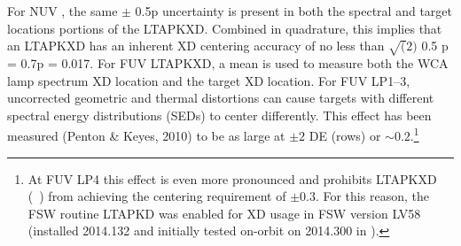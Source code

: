For NUV , the same $\pm$ 0.5p uncertainty is present in both the spectral and target locations portions of the \textsc{LTAPKXD}. Combined in quadrature, this implies that
an \textsc{LTAPKXD} has an inherent XD centering accuracy of no less than $\sqrt(2)$ 0.5 p = 0.7p = 0.017\arcsec. For FUV \textsc{LTAPKXD}, a mean is used to measure both the WCA lamp spectrum XD location and the target XD location.
For FUV LP1--3, uncorrected geometric and thermal distortions can cause targets with different spectral energy distributions (SEDs) to center differently. This effect has been measured (Penton \& Keyes, 2010) to be as large at $\pm 2$ DE (rows) or
$\sim 0.2$\arcsec.\footnote{At FUV LP4 this effect is even more pronounced and prohibits \textsc{LTAPKXD} (\numposone~) from achieving the centering requirement of $\pm 0.3$\arcsec. For this reason, the  FSW routine \textsc{LTAPKD} was enabled
for XD usage in FSW version LV58 (installed 2014.132 and initially tested on-orbit on 2014.300 in ).}
